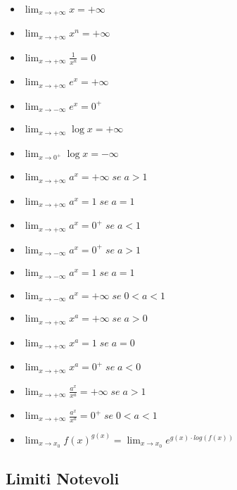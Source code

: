 \documentclass{article}
\begin{document}
\begin{multicols}{2}
    \begin{itemize}
        \item $\displaystyle \lim_{x \to + \infty} x = + \infty$
        \item $\displaystyle \lim_{x \to + \infty} x^n = + \infty$
        \item $\displaystyle \lim_{x \to + \infty} \frac{1}{x^n} = 0$
        \item $\displaystyle \lim_{x \to + \infty} e^x = + \infty$
        \item $\displaystyle \lim_{x \to - \infty} e^x = 0^+$
        \item $\displaystyle \lim_{x \to + \infty} \log x = + \infty$
        \item $\displaystyle \lim_{x \to 0^+} \log x = - \infty$
        \item $\displaystyle \lim_{x \to + \infty} a^x = + \infty \; se \; a > 1$
        \item $\displaystyle \lim_{x \to + \infty} a^x = 1 \; se \; a = 1$
        \item $\displaystyle \lim_{x \to + \infty} a^x = 0^+ \; se \; a < 1$
        \item $\displaystyle \lim_{x \to - \infty} a^x = 0^+ \; se \; a > 1$
        \item $\displaystyle \lim_{x \to - \infty} a^x = 1 \; se \; a = 1$
        \item $\displaystyle \lim_{x \to - \infty} a^x = + \infty \; se \; 0 < a < 1$
        \item $\displaystyle \lim_{x \to + \infty} x^a = + \infty \; se \; a > 0$
        \item $\displaystyle \lim_{x \to + \infty} x^a = 1 \; se \; a = 0$
        \item $\displaystyle \lim_{x \to + \infty} x^a = 0^+ \; se \; a < 0$
        \item $\displaystyle \lim_{x \to + \infty} \frac{a^x}{x^a} = + \infty \; se \; a > 1$
        \item $\displaystyle \lim_{x \to + \infty} \frac{a^x}{x^a} = 0^+ \; se \; 0 < a < 1$
        \item $\displaystyle \lim_{x \to x_0} f(x)^{g(x)} = \lim_{x \to x_0} e^{g(x) \cdot log(f(x))}$
    \end{itemize}
\end{multicols}

\newpage

\subsection{Limiti Notevoli}
\end{document}
